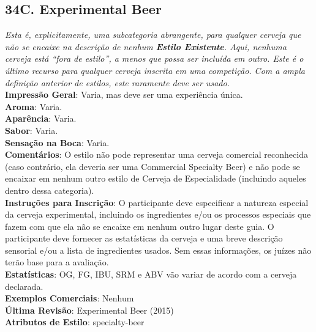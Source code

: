 \subsection*{34C. Experimental Beer}
\textit{Esta é, explicitamente, uma subcategoria abrangente, para qualquer cerveja que não se encaixe na descrição de nenhum \textbf{Estilo Existente}. Aqui, nenhuma cerveja está “fora de estilo”, a menos que possa ser incluída em outro. Este é o último recurso para qualquer cerveja inscrita em uma competição. Com a ampla definição anterior de estilos, este raramente deve ser usado.}\\
\textbf{Impressão Geral}: Varia, mas deve ser uma experiência única. \\
\textbf{Aroma}: Varia. \\
\textbf{Aparência}: Varia. \\
\textbf{Sabor}: Varia. \\
\textbf{Sensação na Boca}: Varia. \\
\textbf{Comentários}: O estilo não pode representar uma cerveja comercial reconhecida (caso contrário, ela deveria ser uma Commercial Specialty Beer) e não pode se encaixar em nenhum outro estilo de Cerveja de Especialidade (incluindo aqueles dentro dessa categoria). \\
\textbf{Instruções para Inscrição}: O participante deve especificar a natureza especial da cerveja experimental, incluindo os ingredientes e/ou os processos especiais que fazem com que ela não se encaixe em nenhum outro lugar deste guia. O participante deve fornecer as estatísticas da cerveja e uma breve descrição sensorial e/ou a lista de ingredientes usados. Sem essas informações, os juízes não terão base para a avaliação. \\
\textbf{Estatísticas}: OG, FG, IBU, SRM e ABV vão variar de acordo com a cerveja declarada. \\
\textbf{Exemplos Comerciais}: Nenhum \\
\textbf{Última Revisão}: Experimental Beer (2015) \\
\textbf{Atributos de Estilo}: specialty-beer
